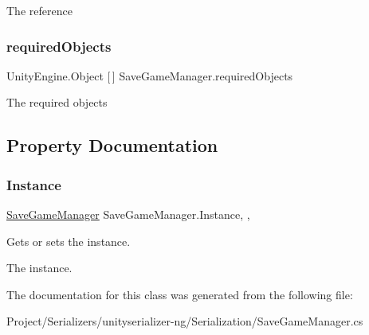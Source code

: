 The reference 

\mbox{\label{class_save_game_manager_ac283b8025430fb42da7de00348802d10}} 
\subsubsection{\texorpdfstring{required\+Objects}{requiredObjects}}
{\footnotesize\ttfamily Unity\+Engine.\+Object \mbox{[}$\,$\mbox{]} Save\+Game\+Manager.\+required\+Objects}



The required objects 



\subsection{Property Documentation}
\mbox{\label{class_save_game_manager_a305a46aed22f9f5d1fd473f033b90408}} 
\subsubsection{\texorpdfstring{Instance}{Instance}}
{\footnotesize\ttfamily \hyperlink{class_save_game_manager}{Save\+Game\+Manager} Save\+Game\+Manager.\+Instance\hspace{0.3cm}{\ttfamily [static]}, {\ttfamily [get]}, {\ttfamily [set]}}



Gets or sets the instance. 

The instance.

The documentation for this class was generated from the following file\+:\begin{DoxyCompactItemize}
\item 
Project/\+Serializers/unityserializer-\/ng/\+Serialization/Save\+Game\+Manager.\+cs\end{DoxyCompactItemize}
